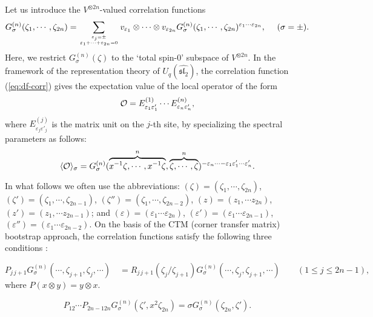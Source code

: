 \documentclass[a4paper,10pt]{article}
\begin{document}
Let us introduce the $V^{\otimes 2n}$-valued 
correlation functions 
\begin{equation}
G^{(n)}_\sigma(\zeta_1,\cdots,\zeta_{2n})=
\sum_{\varepsilon_j =\pm\atop \varepsilon_1 +
\cdots +\varepsilon_{2n}=0} v_{\varepsilon_1} \otimes 
\cdots \otimes v_{\varepsilon_{2n}} 
G^{(n)}_\sigma(\zeta_1,\cdots,\zeta_{2n})
^{\varepsilon_1 \cdots \varepsilon_{2n}}, 
~~~~ (\sigma =\pm ). 
\label{eq:df-corr}
\end{equation}
Here, we restrict $G^{(n)}_\sigma(\zeta)$ 
to the `total spin-$0$' subspace of $V^{\otimes 2n}$. 
In the framework of the representation theory of 
$U_q (\widehat{\mathfrak{sl}_2})$, the correlation 
function (\ref{eq:df-corr}) gives the expectation 
value of the local operator of the form 
$$
{\cal O}=E^{(1)}_{\varepsilon_1 \varepsilon'_1} 
\cdots E^{(n)}_{\varepsilon_n \varepsilon'_n}, 
$$
where $E^{(j)}_{\varepsilon_j \varepsilon'_j}$ 
is the matrix unit on the $j$-th site, by specializing 
the spectral parameters as follows: 
\begin{equation}
\langle {\cal O} \rangle_\sigma 
=G^{(n)}_\sigma(\overbrace{x^{-1}\zeta,\cdots,
x^{-1}\zeta}^{n}, \overbrace{\zeta,\cdots,\zeta}^{n})^{
-\varepsilon_{n}\cdots -\varepsilon_{1}\varepsilon'_1 
\cdots \varepsilon'_{n}}. 
\label{eq:spec}
\end{equation}

In what follows we often use the abbreviations: 
$(\zeta) =(\zeta_1 , \cdots , \zeta_{2n})$, 
$(\zeta') =(\zeta_1 , \cdots , \zeta_{2n-1})$, 
$(\zeta'') =(\zeta_1 , \cdots , \zeta_{2n-2})$, 
$(z)=(z_1 , \cdots z_{2n})$, 
$(z')=(z_1 , \cdots z_{2n-1})$; and 
$(\varepsilon )=(\varepsilon_1 \cdots \varepsilon_{2n})$, 
$(\varepsilon')=(\varepsilon_1 \cdots \varepsilon_{2n-1})$, 
$(\varepsilon'')=(\varepsilon_1 \cdots \varepsilon_{2n-2})$. 
On the basis of the CTM (corner transfer matrix) bootstrap 
approach, the correlation functions satisfy the following 
three conditions \cite{JMN}: 

\begin{equation}
P_{j\,j+1} G_{\sigma}^{(n)} 
(\cdots,\zeta_{j+1},\zeta_j,\cdots) 
\quad =
R_{j\,j+1}(\zeta_j/\zeta_{j+1})G_{\sigma}^{(n)} 
(\cdots,\zeta_j,\zeta_{j+1},\cdots)
\qquad (1\leqslant j\leqslant 2n-1), 
\label{eq:R-symm} 
\end{equation}
where $P(x\otimes y)=y\otimes x$. 

\begin{equation}
P_{12}\cdots P_{2n-1 2n} 
G_{\sigma}^{(n)} (\zeta', x^{2}\zeta_{2n})
=\sigma G_{\sigma}^{(n)} (\zeta_{2n}, \zeta'). 
\label{eq:cyc}
\end{equation}
\end{document}
